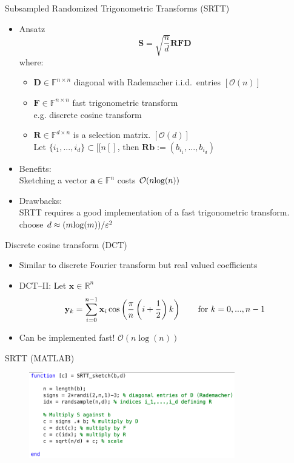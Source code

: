 \documentclass{beamer}
\newcommand{\bvec}[1]{\mathbf{#1}}
\newcommand{\va}{\bvec{a}}
\newcommand{\vb}{\bvec{b}}
\newcommand{\vx}{\bvec{x}}
\newcommand{\vy}{\bvec{y}}
\newcommand{\vD}{\bvec{D}}
\newcommand{\vF}{\bvec{F}}
\newcommand{\vR}{\bvec{R}}
\newcommand{\vS}{\bvec{S}}
\newcommand{\bitem}{\item[$\bullet$]}
\begin{document}
\begin{frame}{{\small Subsampled Randomized Trigonometric Transforms (SRTT)}}

\begin{itemize}
    \bitem Ansatz
    $$
    \vS 
    =
    \sqrt{\frac{n}{d}} \vR \vF \vD
    $$
    where: 
    \begin{itemize}
        \item $\vD \in \mathbb{F}^{n \times n}$ diagonal with Rademacher i.i.d.~entries \hfill $[\mathcal{O}(n)]$
        \item $\vF \in \mathbb{F}^{n \times n}$ fast trigonometric transform\\
         e.g. discrete cosine transform
        \item $\vR \in \mathbb{F}^{d \times n}$ is a selection matrix.  \hfill $[\mathcal{O}(d)]$\\
        Let $\{i_1,...,i_d\}\subset [\![n [\!]$, then $\vR \vb := (b_{i_1},...,b_{i_d})$ 
    \end{itemize}
    \bitem Benefits:\\
    Sketching a vector $\va\in\mathbb{F}^{n}$ costs $\mathcal{O}(n {\rm log}(n))$
    \bitem Drawbacks:\\
    SRTT requires a good implementation of a fast trigonometric transform.\\
    choose $d \approx (m {\rm log}(m))/\varepsilon^2$    
\end{itemize}
    
\end{frame}


\begin{frame}{Discrete cosine transform (DCT)}
\begin{itemize}
    \bitem Similar to discrete Fourier transform but real valued coefficients 
    \bitem DCT--II: Let $\vx\in\mathbb{R}^n$
    $$
    \vy_k = \sum_{i=0}^{n-1} \vx_{i} \cos \left(\frac{\pi}{n}\left(i+\frac{1}{2}\right)k \right)
    \qquad {\rm for ~} k=0,...,n-1
    $$
    \bitem Can be implemented fast! $\mathcal{O} (n \log(n))$
\end{itemize}
    
\end{frame}


\begin{frame}{SRTT (MATLAB)}

\begin{figure}
    \centering
    \includegraphics[width = 0.8\textwidth]{Graphics/SRTT.png}
\end{figure}
    
\end{frame}
\end{document}
